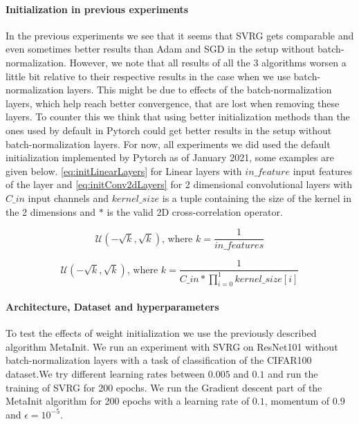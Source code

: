 \documentclass[a4paper,11pt,oneside]{report}
\begin{document}
\paragraph{Initialization in previous experiments}
In the previous experiments we see that it seems that SVRG gets comparable and even sometimes better results than Adam and SGD in the setup without batch-normalization. 
However, we note that all results of all the 3 algorithms worsen a little bit relative to their respective results in the case when we use batch-normalization layers. 
This might be due to effects of the batch-normalization layers, which help reach better convergence, that are lost when removing these layers.
To counter this we think that using better initialization methods than the ones used by default in Pytorch could get better results in the setup without batch-normalization layers.
For now, all experiments we did used the default initialization implemented by Pytorch as of January 2021, some examples are given below.
\autoref{eq:initLinearLayers} for Linear layers with $in\_feature$ input features of the layer and \autoref{eq:initConv2dLayers} for 2 dimensional convolutional layers with $C\_in$ input channels and $kernel\_size$ is a tuple containing the size of the kernel in the 2 dimensions and $*$ is the valid 2D cross-correlation operator. 

\begin{equation}\label{eq:initLinearLayers}
    \mathcal{U}(-\sqrt{k}, \sqrt{k}) \text{, where } k = \frac{1}{in\_features}
\end{equation}

\begin{equation}\label{eq:initConv2dLayers}
    \mathcal{U}(-\sqrt{k}, \sqrt{k}) \text{, where }
    k = \frac{1}{C\_in * \prod_{i=0}^{1}kernel\_size[i]} 
\end{equation}

\paragraph{Architecture, Dataset and hyperparameters}
To test the effects of weight initialization we use the previously described algorithm MetaInit. We run an experiment with SVRG on ResNet101 without batch-normalization layers with a task of classification of the CIFAR100 dataset.We try different learning rates between $0.005$ and $0.1$ and run the training of SVRG for 200 epochs. We run the Gradient descent part of the MetaInit algorithm for 200 epochs with a learning rate of $0.1$, momentum of $0.9$ and $\epsilon = 10^{-5}$.  
\end{document}
